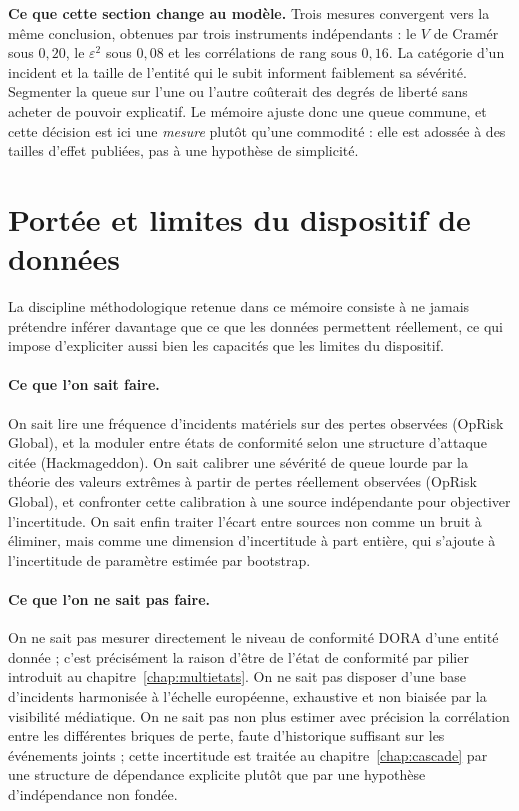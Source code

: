 \begin{cle}
\textbf{Ce que cette section change au modèle.} Trois mesures convergent vers la même
conclusion, obtenues par trois instruments indépendants : le $V$ de Cramér sous $0{,}20$, le
$\varepsilon^2$ sous $0{,}08$ et les corrélations de rang sous $0{,}16$. La catégorie d'un
incident et la taille de l'entité qui le subit informent faiblement sa sévérité. Segmenter la
queue sur l'une ou l'autre coûterait des degrés de liberté sans acheter de pouvoir explicatif.
Le mémoire ajuste donc une queue commune, et cette décision est ici une \emph{mesure} plutôt
qu'une commodité : elle est adossée à des tailles d'effet publiées, pas à une hypothèse de
simplicité.
\end{cle}


\section{Portée et limites du dispositif de données}

La discipline méthodologique retenue dans ce mémoire consiste à ne jamais
prétendre inférer davantage que ce que les données permettent réellement, ce
qui impose d'expliciter aussi bien les capacités que les limites du dispositif.

\paragraph{Ce que l'on sait faire.} On sait lire une fréquence d'incidents
matériels sur des pertes observées (OpRisk Global), et la moduler entre états de
conformité selon une structure d'attaque citée (Hackmageddon).
On sait calibrer une sévérité de queue lourde par la théorie des valeurs
extrêmes à partir de pertes réellement observées (OpRisk Global), et
confronter cette calibration à une source indépendante pour objectiver
l'incertitude. On sait enfin traiter l'écart entre sources non comme un bruit
à éliminer, mais comme une dimension d'incertitude à part entière, qui
s'ajoute à l'incertitude de paramètre estimée par bootstrap.

\paragraph{Ce que l'on ne sait pas faire.} On ne sait pas mesurer directement
le niveau de conformité DORA d'une entité donnée ; c'est précisément la
raison d'être de l'état de conformité par pilier introduit au
chapitre~\ref{chap:multietats}. On ne sait pas
disposer d'une base d'incidents harmonisée à l'échelle européenne, exhaustive
et non biaisée par la visibilité médiatique. On ne sait pas non plus estimer
avec précision la corrélation entre les différentes briques de perte,
faute d'historique suffisant sur les événements joints ; cette incertitude
est traitée au chapitre~\ref{chap:cascade} par une structure de dépendance explicite plutôt que
par une hypothèse d'indépendance non fondée.

